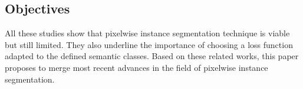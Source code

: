 \documentclass[../thesis.tex]{subfiles}
\begin{document}
    \subsection{Objectives}
    
    
    
    
    All these studies show  that pixelwise instance segmentation technique is viable but still limited. They also underline the importance of choosing a loss function adapted to the defined semantic classes. Based on these related works, this paper proposes to merge most recent advances in the field of pixelwise instance segmentation. 
    
\end{document}
